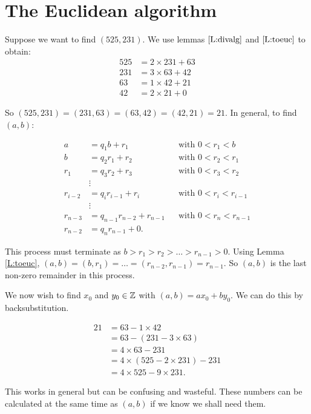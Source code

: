 \documentclass{notes}
\theoremstyle{plain}
\begin{document}
\section{The Euclidean algorithm}

Suppose we want to find $(525,231)$.  We use lemmas $\eqref{L:divalg}$ and
$\eqref{L:toeuc}$ to obtain:
\begin{align*}
525 &= 2 \times 231 + 63 \\
231 &= 3 \times 63 + 42 \\
63 &= 1 \times 42 + 21 \\
42 &= 2 \times 21 + 0
\end{align*}

So $(525,231) = (231,63) = (63,42) = (42,21) = 21$.  In general, to
find $(a,b)$:

\begin{align*}
a & = q_1 b + r_1  & &\text{with } 0 < r_1 < b \\
b &= q_2 r_1 + r_2 & &\text{with } 0 < r_2 < r_1 \\
r_1 &= q_3 r_2 + r_3 & &\text{with } 0 < r_3 < r_2 \\
&\vdots \\
r_{i-2} &= q_i r_{i-1} + r_i & &\text{with } 0 < r_i < r_{i-1} \\
&\vdots \\
r_{n-3} &= q_{n-1} r_{n-2} + r_{n-1} & &\text{with } 0 < r_n < r_{n-1} \\
r_{n-2} &= q_n r_{n-1} + 0.
\end{align*}

This process must terminate as $b > r_1 > r_2 > \dots > r_{n-1} > 0$.
Using Lemma \eqref{L:toeuc}, $(a,b) = (b,r_1) = \dots = (r_{n-2},r_{n-1})
= r_{n-1}$.  So $(a,b)$ is the last non-zero remainder in this process.

We now wish to find $x_0$ and $y_0 \in \mathbb{Z}$ with $(a,b) = a x_0 + b y_0$.
We can do this by backsubstitution.

\begin{align*}
21 &= 63 - 1 \times 42 \\
   &= 63 - (231 - 3 \times 63) \\
   &= 4 \times 63 - 231 \\
   &= 4 \times (525 - 2 \times 231) - 231 \\
   &= 4 \times 525 - 9 \times 231.
\end{align*}

This works in general but can be confusing and wasteful.  These numbers
can be calculated at the same time as $(a,b)$ if we know we shall need them.
\end{document}
